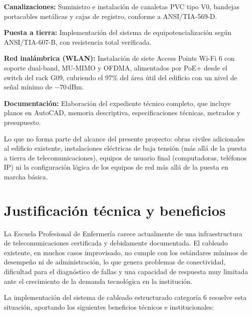 \textbf{Canalizaciones:} Suministro e instalación de canaletas PVC tipo V0, bandejas portacables metálicas y cajas
de registro, conforme a \mbox{ANSI/TIA-569-D}.

\textbf{Puesta a tierra:} Implementación del sistema de equipotencialización según \mbox{ANSI/TIA-607-B},
con resistencia total verificada.

\textbf{Red inalámbrica (WLAN):} Instalación de siete Access Points Wi-Fi 6 con soporte dual-band, MU-MIMO y OFDMA, alimentados por PoE+
desde el switch del rack G09, cubriendo el 97\% del área útil del edificio con
un nivel de señal mínimo de $-70$\,dBm.

\textbf{Documentación:} Elaboración del expediente técnico completo, que incluye
planos en AutoCAD, memoria descriptiva, especificaciones técnicas, metrados y
presupuesto.

Lo que no forma parte del alcance del presente proyecto: obras civiles
adicionales al edificio existente, instalaciones eléctricas de baja tensión
(más allá de la puesta a tierra de telecomunicaciones), equipos de usuario final
(computadoras, teléfonos IP) ni la configuración lógica de los equipos de red
más allá de la puesta en marcha básica.

\section{Justificación técnica y beneficios}
\label{sec:justificacion}

La Escuela Profesional de Enfermería carece actualmente de una infraestructura
de telecomunicaciones certificada y debidamente documentada. El cableado existente,
en muchos casos improvisado, no cumple con los estándares mínimos de desempeño
ni de administración, lo que genera problemas de conectividad, dificultad para
el diagnóstico de fallas y una capacidad de respuesta muy limitada ante el
crecimiento de la demanda tecnológica en la institución.

La implementación del sistema de cableado estructurado categoría 6 resuelve
esta situación, aportando los siguientes beneficios técnicos e institucionales:

